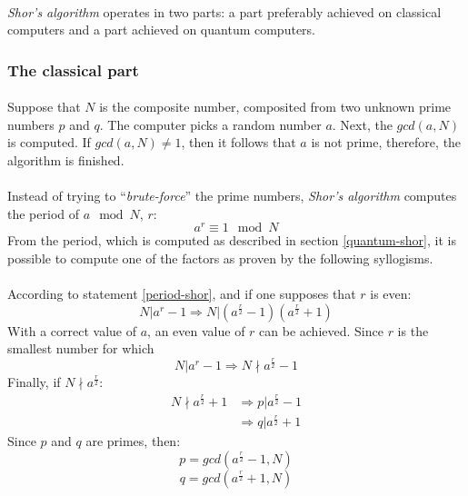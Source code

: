 \documentclass[a4paper, 10pt]{article}
\begin{document}
\paragraph*{}
\textit{Shor's algorithm} operates in two parts: a part preferably achieved on classical computers and a part achieved 
on quantum computers.

\subsubsection{The classical part}
\paragraph*{}
Suppose that $N$ is the composite number, composited from two unknown prime numbers $p$ and $q$. The computer picks a 
random number $a$. Next, the $gcd(a, N)$ is computed. If $gcd(a, N) \not = 1$, then it follows that $a$ is not prime, 
therefore, the algorithm is finished.

\paragraph*{}
Instead of trying to ``\textit{brute-force}'' the prime numbers, \textit{Shor's algorithm} computes the period of 
$a \mod N$, $r$:
\begin{equation} \label{period-shor}
a^r \equiv 1 \mod N
\end{equation}
From the period, which is computed as described in section \ref{quantum-shor}, it is possible to compute one of the 
factors as proven by the following syllogisms.

\paragraph*{}
According to statement \ref{period-shor}, and if one supposes that $r$ is even:
$$N | a^r - 1 \Rightarrow N | (a^{\frac{r}{2}} - 1) (a^{\frac{r}{2}} + 1)$$
With a correct value of $a$, an even value of $r$ can be achieved. Since $r$ is the smallest number for which 
$$N | a^r - 1 \Rightarrow N \nmid a^{\frac{r}{2}} - 1$$
Finally, if $N \nmid a^{\frac{r}{2}}$:
\begin{equation}
\begin{split}
N \nmid a^{\frac{r}{2}} + 1 & \Rightarrow p | a^{\frac{r}{2}} - 1 \\
                            & \Rightarrow q | a^{\frac{r}{2}} + 1
\end{split}
\end{equation}
Since $p$ and $q$ are primes, then:
$$p = gcd(a^{\frac{r}{2}} - 1, N)$$
$$q = gcd(a^{\frac{r}{2}} + 1, N)$$
\end{document}
